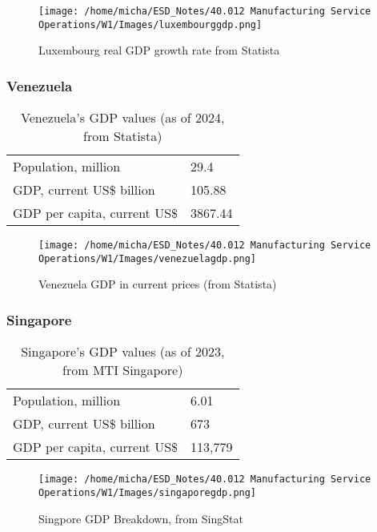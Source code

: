 \documentclass[12pt]{article}
\begin{document}
\begin{figure}[H]
    \centering
    \texttt{[image: /home/micha/ESD\_Notes/40.012 Manufacturing Service Operations/W1/Images/luxembourggdp.png]}
    \caption{Luxembourg real GDP growth rate from Statista}
    \label{fig:5-luxgdp}
\end{figure} 


\subsubsection*{Venezuela}

\begin{table}[H]
    \centering
    \begin{tabular}{l l} \hline
        Population, million & 29.4 \\ 
        GDP, current US\$ billion & 105.88 \\ 
        GDP per capita, current US\$ & 3867.44 \\ \hline 
    \end{tabular}
    \caption{Venezuela's GDP values (as of 2024, from Statista)}
    \label{5-vengdp}
\end{table}

\begin{figure}[H]
    \centering
    \texttt{[image: /home/micha/ESD\_Notes/40.012 Manufacturing Service Operations/W1/Images/venezuelagdp.png]}
    \caption{Venezuela GDP in current prices (from Statista)}
    \label{fig:5-vengdp}
\end{figure} 

\subsubsection*{Singapore}

\begin{table}[H]
    \centering
    \begin{tabular}{l l} \hline
        Population, million & 6.01 \\ 
        GDP, current US\$ billion & 673 \\ 
        GDP per capita, current US\$ & 113,779 \\ \hline 
    \end{tabular}
    \caption{Singapore's GDP values (as of 2023, from MTI Singapore)}
    \label{5-sggdp}
\end{table}

\begin{figure}[H]
    \centering
    \texttt{[image: /home/micha/ESD\_Notes/40.012 Manufacturing Service Operations/W1/Images/singaporegdp.png]}
    \caption{Singpore GDP Breakdown, from SingStat}
    \label{fig:5-sggdp}
\end{figure} 
\end{document}
